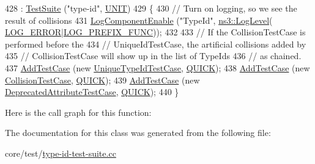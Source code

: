 \begin{DoxyCode}
428   : \hyperlink{classns3_1_1TestSuite_a904b0c40583b744d30908aeb94636d1a}{TestSuite} (\textcolor{stringliteral}{"type-id"}, \hyperlink{classns3_1_1TestSuite_a1ebfcab34ec8161e085e8e3a1855eae0a3885375a3787abf60431f8454b3cadbd}{UNIT})
429 \{
430   \textcolor{comment}{// Turn on logging, so we see the result of collisions}
431   \hyperlink{namespacens3_adc4ef4f00bb2f5f4edae67fc3bc27f20}{LogComponentEnable} (\textcolor{stringliteral}{"TypeId"}, \hyperlink{namespacens3_aa6464a4d69551a9cc968e17a65f39bdb}{ns3::LogLevel}(
      \hyperlink{namespacens3_aa6464a4d69551a9cc968e17a65f39bdba4055b1591e6f4a44495a693a01c4f3e3}{LOG\_ERROR}|\hyperlink{namespacens3_aa6464a4d69551a9cc968e17a65f39bdba0dd332264f60317e9a365095e80037d1}{LOG\_PREFIX\_FUNC}));
432   
433   \textcolor{comment}{// If the CollisionTestCase is performed before the}
434   \textcolor{comment}{// UniqueIdTestCase, the artificial collisions added by}
435   \textcolor{comment}{// CollisionTestCase will show up in the list of TypeIds}
436   \textcolor{comment}{// as chained.}
437   \hyperlink{classns3_1_1TestCase_a3718088e3eefd5d6454569d2e0ddd835}{AddTestCase} (\textcolor{keyword}{new} \hyperlink{classUniqueTypeIdTestCase}{UniqueTypeIdTestCase}, \hyperlink{classns3_1_1TestCase_a11f6f57c21a0d32e605d192a89550f91ac2f47fb646e77f4ce7d662a69120965f}{QUICK});
438   \hyperlink{classns3_1_1TestCase_a3718088e3eefd5d6454569d2e0ddd835}{AddTestCase} (\textcolor{keyword}{new} \hyperlink{classCollisionTestCase}{CollisionTestCase}, \hyperlink{classns3_1_1TestCase_a11f6f57c21a0d32e605d192a89550f91ac2f47fb646e77f4ce7d662a69120965f}{QUICK});
439   \hyperlink{classns3_1_1TestCase_a3718088e3eefd5d6454569d2e0ddd835}{AddTestCase} (\textcolor{keyword}{new} \hyperlink{classDeprecatedAttributeTestCase}{DeprecatedAttributeTestCase}, 
      \hyperlink{classns3_1_1TestCase_a11f6f57c21a0d32e605d192a89550f91ac2f47fb646e77f4ce7d662a69120965f}{QUICK});
440 \}
\end{DoxyCode}


Here is the call graph for this function\+:




The documentation for this class was generated from the following file\+:\begin{DoxyCompactItemize}
\item 
core/test/\hyperlink{type-id-test-suite_8cc}{type-\/id-\/test-\/suite.\+cc}\end{DoxyCompactItemize}
